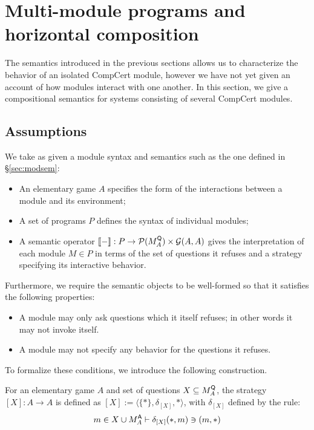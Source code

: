 \section{Multi-module programs and horizontal composition}

The semantics introduced in the previous sections
allows us to characterize the behavior of an isolated
CompCert module,
however we have not yet given an account of
how modules interact with one another.
In this section,
we give a compositional semantics
for systems consisting of several CompCert modules.

\subsection{Assumptions}

We take as given a module syntax and semantics
such as the one defined in \S\ref{sec:modsem}:
\begin{itemize}
\item An elementary game $A$ specifies the form of the interactions
  between a module and its environment;
\item A set of programs $P$ defines the syntax of individual modules;
\item A semantic operator
  $\llbracket - \rrbracket :
   P \rightarrow \mathcal{P}(M_A^{ \mathsf{Q} }) \times \mathcal{G}(A, A)$
  gives the interpretation of each module $M \in P$
  in terms of the set of questions it refuses
  and a strategy specifying its interactive behavior.
\end{itemize}
Furthermore,
we require the semantic objects to be well-formed
so that it satisfies the following properties:
\begin{itemize}
\item A module may only ask questions which it itself refuses;
  in other words it may not invoke itself.
\item A module may not specify any behavior for the questions
  it refuses.
\end{itemize}

To formalize these conditions,
we introduce the following construction.

\begin{definition}[Restriction]
For an elementary game $A$
and set of questions $X \subseteq M_A^{ \mathsf{Q} }$,
the strategy $[X] : A \rightarrow A$
is defined as $[X] := \langle \{*\}, \delta_{[X]}, * \rangle$,
with $\delta_{[X]}$ defined by the rule:
\[
    m \in X \cup M_A^{ \mathsf{A} } \vdash \delta_{[X]}(*, m) \ni (m, *)
\]
\end{definition}

